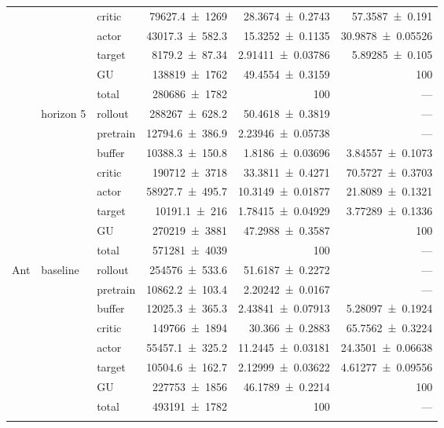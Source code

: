 {\begin{longtable}{@{}lllrrr@{}}
     &  & critic & \num{79627.4+-1269} & \num{28.3674+-0.2743} & \num{57.3587+-0.191} \\
     &  & actor & \num{43017.3+-582.3} & \num{15.3252+-0.1135} & \num{30.9878+-0.05526} \\
     &  & target & \num{8179.2+-87.34} & \num{2.91411+-0.03786} & \num{5.89285+-0.105} \\
     &  & GU & \num{138819+-1762} & \num{49.4554+-0.3159} & 100 \\
     &  & total & \num{280686+-1782} & \num{100} & --- \\
    \addlinespace[2pt]
     & horizon 5 & rollout & \num{288267+-628.2} & \num{50.4618+-0.3819} & --- \\
     &  & pretrain & \num{12794.6+-386.9} & \num{2.23946+-0.05738} & --- \\
     &  & buffer & \num{10388.3+-150.8} & \num{1.8186+-0.03696} & \num{3.84557+-0.1073} \\
     &  & critic & \num{190712+-3718} & \num{33.3811+-0.4271} & \num{70.5727+-0.3703} \\
     &  & actor & \num{58927.7+-495.7} & \num{10.3149+-0.01877} & \num{21.8089+-0.1321} \\
     &  & target & \num{10191.1+-216} & \num{1.78415+-0.04929} & \num{3.77289+-0.1336} \\
     &  & GU & \num{270219+-3881} & \num{47.2988+-0.3587} & 100 \\
     &  & total & \num{571281+-4039} & \num{100} & --- \\
    \addlinespace[2pt]
    \midrule
    Ant & baseline & rollout & \num{254576+-533.6} & \num{51.6187+-0.2272} & --- \\
     &  & pretrain & \num{10862.2+-103.4} & \num{2.20242+-0.0167} & --- \\
     &  & buffer & \num{12025.3+-365.3} & \num{2.43841+-0.07913} & \num{5.28097+-0.1924} \\
     &  & critic & \num{149766+-1894} & \num{30.366+-0.2883} & \num{65.7562+-0.3224} \\
     &  & actor & \num{55457.1+-325.2} & \num{11.2445+-0.03181} & \num{24.3501+-0.06638} \\
     &  & target & \num{10504.6+-162.7} & \num{2.12999+-0.03622} & \num{4.61277+-0.09556} \\
     &  & GU & \num{227753+-1856} & \num{46.1789+-0.2214} & 100 \\
     &  & total & \num{493191+-1782} & \num{100} & --- \\
    \addlinespace[2pt]

\end{longtable}}
